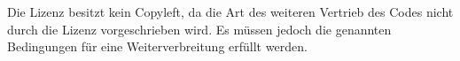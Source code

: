 Die Lizenz besitzt kein Copyleft, da die Art des weiteren Vertrieb des Codes nicht durch die Lizenz vorgeschrieben wird. Es m\"ussen jedoch die genannten Bedingungen f\"ur eine Weiterverbreitung erf\"ullt werden.

